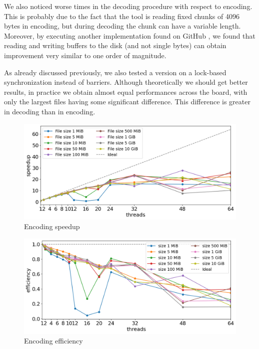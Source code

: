 We also noticed worse times in the decoding procedure with respect to encoding. This is probably due to the fact that the tool is reading fixed chunks of 4096 bytes in encoding, but during decoding the chunk can have a variable length.
Moreover, by executing another implementation found on GitHub \cite{HuffmanParallel2}, we found that reading and writing buffers to the disk (and not single bytes) can obtain improvement very similar to one order of magnitude.

As already discussed previously, we also tested a version on a lock-based synchronization instead of barriers. Although theoretically we should get better results, in practice we obtain almost equal performances across the board, with only the largest files having some significant difference. This difference is greater in decoding than in encoding.

\begin{figure}
	\centering
	\includegraphics[width=1\linewidth]{"../imgs/encoding speedup wide"}
	\caption{Encoding speedup}
	\label{fig:encoding-speedup}
\end{figure}
\begin{figure}
	\centering
	\includegraphics[width=1\linewidth]{"../imgs/encode efficiency wide"}
	\caption{Encoding efficiency}
	\label{fig:encoding-efficiency}
\end{figure}


